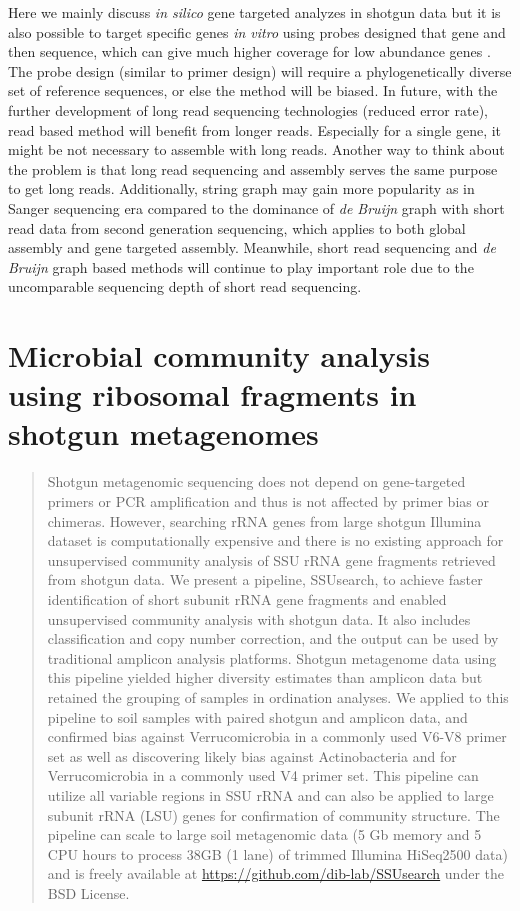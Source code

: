 \documentclass[]{msu-thesis}
\begin{document}
Here we mainly discuss \textit{in silico} gene targeted analyzes in
shotgun data but it is also possible to target specific genes
\textit{in vitro} using probes designed that gene and then sequence,
which can give much higher coverage for low abundance genes
\cite{mercer_targeted_2014}. The probe design (similar to primer
design) will require a phylogenetically diverse set of reference
sequences, or else the method will be biased. In future, with the
further development of long read sequencing technologies (reduced
error rate), read based method will benefit from longer
reads. Especially for a single gene, it might be not necessary to
assemble with long reads. Another way to think about the problem is
that long read sequencing and assembly serves the same purpose to get
long reads. Additionally, string graph may gain more popularity as in
Sanger sequencing era compared to the dominance of \textit{de Bruijn}
graph with short read data from second generation sequencing, which
applies to both global assembly and gene targeted assembly. Meanwhile,
short read sequencing and \textit{de Bruijn} graph based methods will
continue to play important role due to the uncomparable sequencing
depth of short read sequencing.





\chapter{Microbial community analysis using ribosomal fragments in shotgun metagenomes}

\begin{abstract}
Shotgun metagenomic sequencing does not depend on gene-targeted primers or PCR amplification and thus is not affected by primer bias or chimeras. However, searching rRNA genes from large shotgun Illumina dataset is computationally expensive and there is no existing approach for unsupervised community analysis of SSU rRNA gene fragments retrieved from shotgun data. We present a pipeline, SSUsearch, to achieve faster identification of short subunit rRNA gene fragments and enabled unsupervised community analysis with shotgun data. It also includes classification and copy number correction, and the output can be used by traditional amplicon analysis platforms. Shotgun metagenome data using this pipeline yielded higher diversity estimates than amplicon data but retained the grouping of samples in ordination analyses. We applied to this pipeline to soil samples with paired shotgun and amplicon data, and confirmed bias against Verrucomicrobia in a commonly used V6-V8 primer set as well as discovering likely bias against Actinobacteria and for Verrucomicrobia in a commonly used V4 primer set. This pipeline can utilize all variable regions in SSU rRNA and can also be applied to large subunit rRNA (LSU) genes for confirmation of community structure. The pipeline can scale to large soil metagenomic data (5 Gb memory and 5 CPU hours to process 38GB (1 lane) of trimmed Illumina HiSeq2500 data) and is freely available at \url{https://github.com/dib-lab/SSUsearch} under the BSD License.
\end{abstract}
\end{document}
